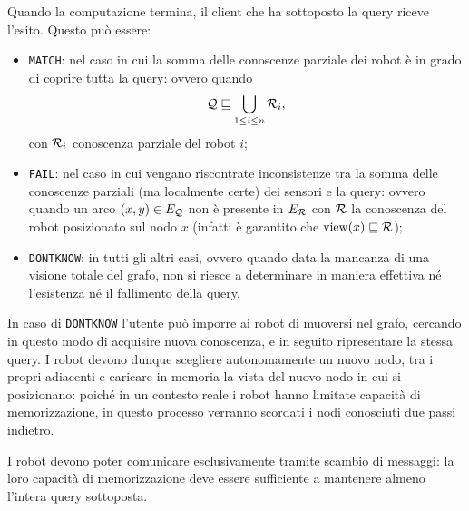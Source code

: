 Quando la computazione termina, il client che ha sottoposto la
query riceve l'esito. Questo può essere:
\begin{itemize}
\item \texttt{MATCH}: nel caso in cui la somma delle conoscenze
parziale dei robot è in grado di coprire tutta la query: ovvero quando \[
\mathcal{Q} \sqsubseteq \bigcup_{1 \leq i \leq n} \mathcal{R}_i, \]
con $\mathcal{R}_i$ conoscenza parziale del robot $i$;
\item \texttt{FAIL}: nel caso in cui vengano riscontrate inconsistenze
tra la somma delle conoscenze parziali (ma localmente certe)
dei sensori e la query: ovvero quando un arco $(x, y) \in E_{\mathcal{Q}}$
non è presente in $E_{\mathcal{R}}$ con $\mathcal{R}$ la conoscenza del robot posizionato
sul nodo $x$ (infatti è garantito che $\mathrm{view}(x) \sqsubseteq \mathcal{R}$);
\item \texttt{DONTKNOW}: in tutti gli altri casi, ovvero quando
data la mancanza di una visione totale del grafo,
non si riesce a determinare in maniera effettiva né l'esistenza né
il fallimento della query.
\end{itemize}

In caso di \texttt{DONTKNOW} l'utente può imporre ai robot di muoversi
nel grafo, cercando in questo modo di acquisire nuova conoscenza,
e in seguito ripresentare la stessa query.
I robot devono dunque scegliere autonomamente un nuovo nodo,
tra i propri adiacenti e caricare in memoria la vista del nuovo
nodo in cui si posizionano: poiché in un contesto reale i
robot hanno limitate capacità di memorizzazione,
in questo processo verranno scordati i nodi conosciuti due
passi indietro.

I robot devono poter comunicare esclusivamente tramite scambio di
messaggi: la loro capacità di memorizzazione deve essere sufficiente
a mantenere almeno l'intera query sottoposta.\\


